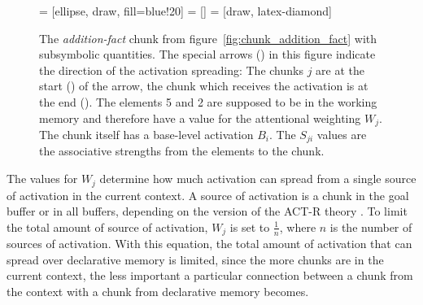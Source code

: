 \begin{figure}[htb]
\centering
{} = [ellipse, draw, fill=blue!20]
 = [] 
 = [draw, latex-diamond]   

\caption[The \emph{addition-fact} chunk from figure~\ref{fig:chunk_addition_fact} with subsymbolic quantities.]
{The \emph{addition-fact} chunk from figure~\ref{fig:chunk_addition_fact} with subsymbolic quantities. The special arrows () in this figure indicate the direction of the activation spreading: The chunks $j$ are at the start () of the arrow, the chunk which receives the activation is at the end (). The elements 5 and 2 are supposed to be in the working memory and therefore have a value for the attentional weighting $W_j$. The chunk itself has a base-level activation $B_i$. The $S_{ji}$ values are the associative strengths from the elements to the chunk. \cite[fig.~5]{anderson_integrated_2004}}
\label{fig:chunk_activation}
\end{figure}

The values for $W_j$ determine how much activation can spread from a single source of activation in the current context. A source of activation is a chunk in the goal buffer or in all buffers, %
depending on the version of the ACT-R theory \cites[1042]{anderson_integrated_2004}[33]{taatgen_modeling_2006}[unit 5, p. 1]{actr_tutorial}. To limit the total amount of source of activation, $W_j$ is set to $\frac{1}{n}$, where $n$ is the number of sources of activation. With this equation, the total amount of activation that can spread over declarative memory is limited, since the more chunks are in the current context, the less important a particular connection between a chunk from the context with a chunk from declarative memory becomes. 

